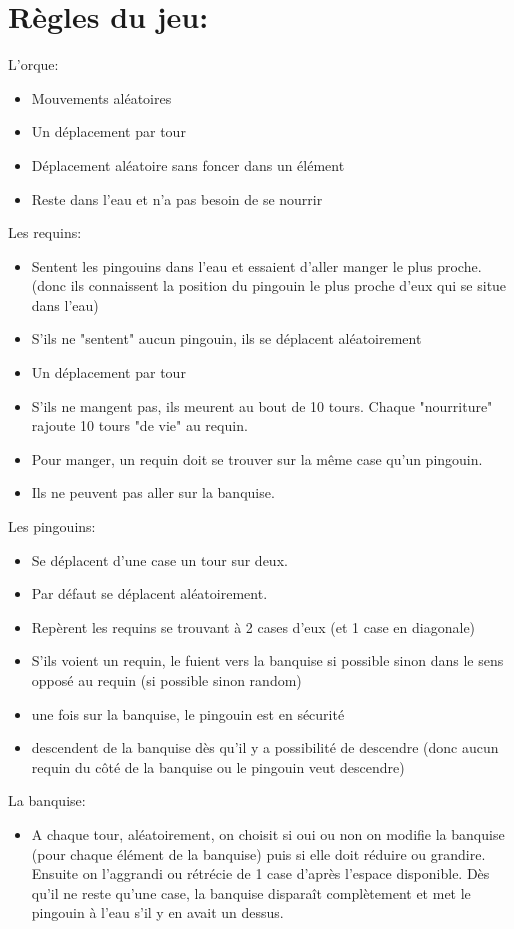 \documentclass[12pt]{article}
\begin{document}
\section{Règles du jeu:}
	L'orque:
	\begin{itemize}
		\item Mouvements aléatoires
		\item Un déplacement par tour
		\item Déplacement aléatoire sans foncer dans un élément
		\item Reste dans l'eau et n'a pas besoin de se nourrir
	\end{itemize}
	Les requins:
	\begin{itemize}
		\item Sentent les pingouins dans l'eau et essaient d'aller manger le plus proche. (donc ils connaissent la position du pingouin le plus proche d'eux qui se situe dans l'eau)
		\item S'ils ne "sentent" aucun pingouin, ils se déplacent aléatoirement
		\item Un déplacement par tour
		\item S'ils ne mangent pas, ils meurent au bout de 10 tours. Chaque "nourriture" rajoute 10 tours "de vie" au requin.
		\item Pour manger, un requin doit se trouver sur la même case qu'un pingouin.
		\item Ils ne peuvent pas aller sur la banquise.
	\end{itemize}
	Les pingouins:
	\begin{itemize}
		\item Se déplacent d'une case un tour sur deux.
		\item Par défaut se déplacent aléatoirement.
		\item Repèrent les requins se trouvant à 2 cases d'eux (et 1 case en diagonale)
		\item S'ils voient un requin, le fuient vers la banquise si possible sinon dans le sens opposé au requin (si possible sinon random)
		\item une fois sur la banquise, le pingouin est en sécurité
		\item descendent de la banquise dès qu'il y a possibilité de descendre (donc aucun requin du côté de la banquise ou le pingouin veut descendre)
	\end{itemize}
	La banquise:
	\begin{itemize}
		\item A chaque tour, aléatoirement, on choisit si oui ou non on modifie la banquise (pour chaque élément de la banquise) puis si elle doit réduire ou grandire. Ensuite on l'aggrandi ou rétrécie de 1 case d'après l'espace disponible. Dès qu'il ne reste qu'une case, la banquise disparaît complètement et met le pingouin à l'eau s'il y en avait un dessus.
	\end{itemize}
\end{document}
